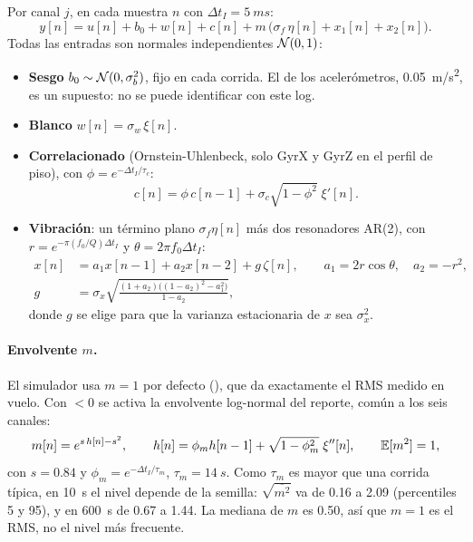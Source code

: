 \documentclass[11pt,a4paper]{article}
\begin{document}
Por canal $j$, en cada muestra $n$ con $\Delta t_I = \SI{5}{ms}$:
\begin{equation}
  y[n] = u[n] + b_0 + w[n] + c[n] + m\,\bigl(\sigma_f\,\eta[n] + x_1[n] + x_2[n]\bigr).
  \label{eq:imu}
\end{equation}
Todas las entradas son normales independientes $\mathcal{N}(0,1)$:
\begin{itemize}
  \item \textbf{Sesgo} $b_0 \sim \mathcal{N}(0,\sigma_b^2)$, fijo en cada corrida. El
        de los acelerómetros, \SI{0.05}{m/s^2}, es un supuesto: no se puede
        identificar con este log.
  \item \textbf{Blanco} $w[n] = \sigma_w\,\xi[n]$.
  \item \textbf{Correlacionado} (Ornstein-Uhlenbeck, solo GyrX y GyrZ en el
        perfil de piso), con $\phi = e^{-\Delta t_I/\tau_c}$:
        \begin{equation}
          c[n] = \phi\,c[n-1] + \sigma_c\sqrt{1-\phi^2}\;\xi'[n].
        \end{equation}
  \item \textbf{Vibración}: un término plano $\sigma_f\eta[n]$ más dos
        resonadores AR(2), con $r = e^{-\pi (f_0/Q)\Delta t_I}$ y
        $\theta = 2\pi f_0\Delta t_I$:
        \begin{align}
          x[n] &= a_1 x[n-1] + a_2 x[n-2] + g\,\zeta[n],
                  \qquad a_1 = 2r\cos\theta,\quad a_2 = -r^2,\\
          g &= \sigma_x \sqrt{\frac{(1+a_2)\bigl((1-a_2)^2 - a_1^2\bigr)}{1-a_2}},
        \end{align}
        donde $g$ se elige para que la varianza estacionaria de $x$ sea
        $\sigma_x^2$.
\end{itemize}

\paragraph{Envolvente $m$.} El simulador usa $m = 1$ por defecto
(), que da exactamente el RMS medido en vuelo. Con
 $< 0$ se activa la envolvente log-normal del reporte, común a
los seis canales:
\begin{equation}
  m[n] = e^{s\,h[n] - s^2},\qquad
  h[n] = \phi_m h[n-1] + \sqrt{1-\phi_m^2}\;\xi''[n],\qquad
  \mathbb{E}[m^2] = 1,
\end{equation}
con $s = 0.84$ y $\phi_m = e^{-\Delta t_I/\tau_m}$, $\tau_m = \SI{14}{s}$. Como
$\tau_m$ es mayor que una corrida típica, en \SI{10}{s} el nivel depende de la
semilla: $\sqrt{\overline{m^2}}$ va de 0.16 a 2.09 (percentiles 5 y 95), y en
\SI{600}{s} de 0.67 a 1.44. La mediana de $m$ es 0.50, así que $m=1$ es el RMS,
no el nivel más frecuente.
\end{document}
